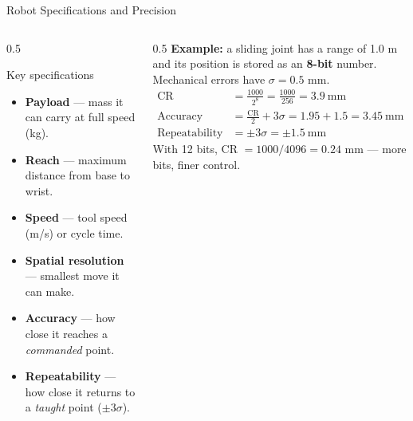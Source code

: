 \documentclass[aspectratio=169]{beamer}
\begin{document}
	\begin{frame}{Robot Specifications and Precision}
		\begin{columns}[T]
			\begin{column}{0.5\textwidth}
				\begin{block}{Key specifications}
					\begin{itemize}\small
						\item \textbf{Payload} --- mass it can carry at full speed (kg).
						\item \textbf{Reach} --- maximum distance from base to wrist.
						\item \textbf{Speed} --- tool speed (m/s) or cycle time.
						\item \textbf{Spatial resolution} --- smallest move it can make.
						\item \textbf{Accuracy} --- how close it reaches a \emph{commanded} point.
						\item \textbf{Repeatability} --- how close it returns to a \emph{taught} point ($\pm3\sigma$).
					\end{itemize}
				\end{block}
			\end{column}
			\begin{column}{0.5\textwidth}
				\textbf{Example:} a sliding joint has a range of 1.0 m and its position is stored as an \textbf{8-bit} number. Mechanical errors have $\sigma = 0.5$ mm.
				\small
				\begin{align*}
					\text{CR} &= \frac{1000}{2^8} = \frac{1000}{256} = \boxed{3.9\ \text{mm}}\\
					\text{Accuracy} &= \frac{\text{CR}}{2} + 3\sigma = 1.95 + 1.5 = \boxed{3.45\ \text{mm}}\\
					\text{Repeatability} &= \pm3\sigma = \pm1.5\ \text{mm}
				\end{align*}
				\footnotesize With 12 bits, CR $= 1000/4096 = 0.24$ mm --- more bits, finer control.
			\end{column}
		\end{columns}
	\end{frame}
\end{document}
